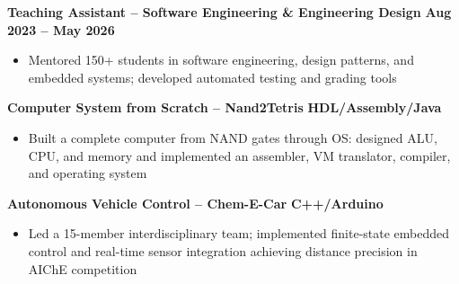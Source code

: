 \documentclass{article}
\begin{document}
 \hfill {}
\textbf{Teaching Assistant – Software Engineering \& Engineering Design} \hfill \textbf{Aug 2023 – May 2026}
\begin{itemize}[noitemsep,topsep=2pt]
    \item Mentored 150+ students in software engineering, design patterns, and embedded systems; developed automated testing and grading tools
\end{itemize}

\textbf{Computer System from Scratch – Nand2Tetris} \hfill \textbf{HDL/Assembly/Java}
\begin{itemize}[noitemsep,topsep=2pt]
    \item Built a complete computer from NAND gates through OS: designed ALU, CPU, and memory and implemented an assembler, VM translator, compiler, and operating system
\end{itemize}
\textbf{Autonomous Vehicle Control – Chem-E-Car} \hfill \textbf{C++/Arduino}
\begin{itemize}[noitemsep,topsep=2pt]
    \item Led a 15-member interdisciplinary team; implemented finite-state embedded control and real-time sensor integration achieving  distance precision in AIChE competition
\end{itemize}


\end{document}
